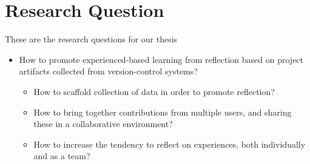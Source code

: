 \section{Research Question}
These are the research questions for our thesis
\begin{itemize}
	\item How to promote experienced-based learning from reflection based on project artifacts collected from version-control systems?
	\begin{itemize}
		\item How to scaffold collection of data in order to promote reflection?
		\item How to bring together contributions from multiple users, and sharing these in a collaborative environment? 
		\item How to increase the tendency to reflect on experiences, both individually and as a team? 
	\end{itemize}
\end{itemize}